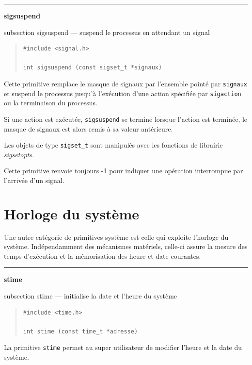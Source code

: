 \documentclass [twoside] {report}
\newcommand {\primitive} [1]
    {
	\phantomsection
	{\large \textbf {#1}}
	\addcontentsline {toc} {subsection} {#1}
    }
\newcommand {\separation}
    {
	\vspace {5mm}
	\nopagebreak
	\hrule
    }
\begin{document}
\separation
\primitive {sigsuspend} --- suspend le processus en attendant un signal

\begin {quote}
\begin {verbatim}
#include <signal.h>

int sigsuspend (const sigset_t *signaux)
\end{verbatim}
\end {quote}

Cette primitive remplace le masque de signaux par l'ensemble pointé par
\texttt {signaux} et suspend le processus jusqu'à l'exécution d'une action
spécifiée par \texttt {sigaction} ou la terminaison du processus.

Si une action est exécutée, \texttt {sigsuspend} se termine lorsque l'action
est terminée, le masque de signaux est alors remis à sa valeur
antérieure.

Les objets de type \texttt {sigset\_t} sont manipulés avec les fonctions de
librairie \emph {sigsetopts}.

Cette primitive renvoie toujours -1 pour indiquer une opération
interrompue par l'arrivée d'un signal.



\section {Horloge du système}


Une autre catégorie de primitives système est
celle qui exploite l'horloge du système.
Indépendamment des mécanismes matériels, celle-ci
assure la mesure des temps d'exé\-cu\-tion et la
mémorisation des heure et date courantes.



\separation
\primitive {stime} --- initialise la date et l'heure du système

\begin {quote}
\begin {verbatim}
#include <time.h>

int stime (const time_t *adresse)
\end{verbatim}
\end {quote}

La primitive \texttt {stime} permet au super
utilisateur de modifier l'heure et la date du
système.
\end{document}
